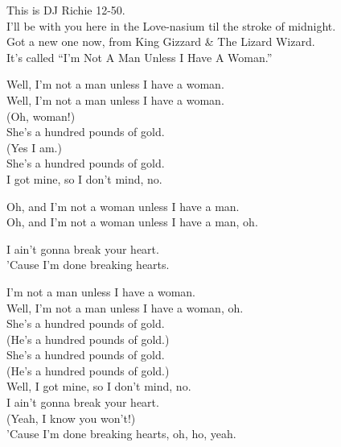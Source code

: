 


This is DJ Richie 12-50. \\
I'll be with you here in the Love-nasium til the stroke of midnight. \\
Got a new one now, from King Gizzard \& The Lizard Wizard. \\
It's called ``I'm Not A Man Unless I Have A Woman.'' \\


Well, I'm not a man unless I have a woman. \\
Well, I'm not a man unless I have a woman. \\
(Oh, woman!) \\

She's a hundred pounds of gold. \\
(Yes I am.) \\
She's a hundred pounds of gold. \\
I got mine, so I don't mind, no. \\


Oh, and I'm not a woman unless I have a man. \\
Oh, and I'm not a woman unless I have a man, oh. \\


I ain't gonna break your heart. \\
'Cause I'm done breaking hearts. \\


I'm not a man unless I have a woman. \\
Well, I'm not a man unless I have a woman, oh. \\

She's a hundred pounds of gold. \\
(He's a hundred pounds of gold.) \\
She's a hundred pounds of gold. \\
(He's a hundred pounds of gold.) \\
Well, I got mine, so I don't mind, no. \\

I ain't gonna break your heart. \\
(Yeah, I know you won't!) \\
'Cause I'm done breaking hearts, oh, ho, yeah. \\

